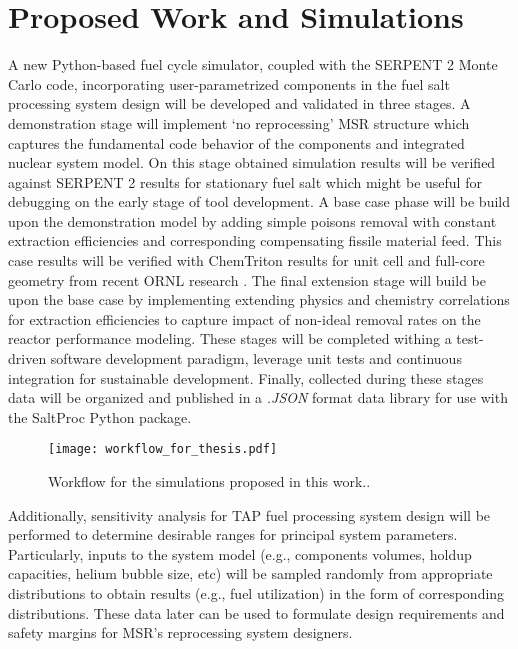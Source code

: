 \section{Proposed Work and Simulations}
A new Python-based fuel cycle simulator, coupled with
the SERPENT 2 Monte Carlo code, incorporating user-parametrized 
components in the fuel salt processing system design will be 
developed and validated in three stages. A demonstration stage will 
implement ‘no reprocessing’ \gls{MSR} structure which captures the 
fundamental code behavior of the components and integrated nuclear 
system model. On this stage obtained simulation results will be 
verified against SERPENT 2 results for stationary fuel salt which 
might be useful for debugging on the early stage of tool development.
A base case phase will be build upon the demonstration model by 
adding simple poisons removal with constant extraction efficiencies 
and corresponding compensating fissile material feed. This case 
results will be 
verified with ChemTriton results for unit cell and full-core 
geometry from recent \gls{ORNL} research 
\cite{betzler_two-dimensional_2016, betzler_assessment_2017}.
The final extension stage will build be upon the base case by 
implementing extending physics and chemistry correlations for 
extraction efficiencies to capture impact of non-ideal 
removal rates on the reactor performance modeling. These 
stages will be completed withing a test-driven software 
development paradigm, leverage unit tests and 
continuous integration for sustainable development. Finally, 
collected during these stages data will be organized and 
published in a \textit{.JSON} format data library for use 
with the SaltProc Python package.
\begin{figure}[ht!] %
  \centering
  \texttt{[image: workflow\_for\_thesis.pdf]} 
  \caption{Workflow for the simulations proposed in this work..}
  \label{fig:workflow}
\end{figure}

Additionally, sensitivity analysis for \gls{TAP} fuel processing 
system design will be performed to determine desirable ranges 
for principal system parameters. Particularly, inputs to the 
system model (e.g., components volumes, holdup capacities, helium 
bubble size, etc) will be sampled randomly from appropriate 
distributions to obtain results (e.g., fuel utilization) in the 
form of corresponding distributions. These data later can be used 
to formulate design requirements and safety margins for 
\gls{MSR}'s reprocessing system designers.

